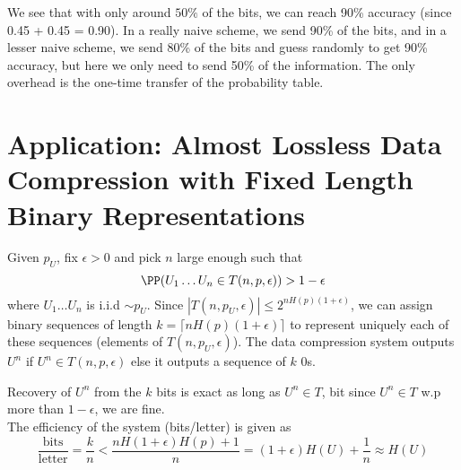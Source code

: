 \begin{figure}[h]
\centering
\end{figure}
We see that with only around $50\%$ of the bits, we can reach 90\% accuracy (since 0.45 + 0.45 = 0.90). In a really naive scheme, we send 90\% of the bits, and in a lesser naive scheme, we send 80\% of the bits and guess randomly to get 90\% accuracy, but here we only need to send 50\% of the information. The only overhead is the one-time transfer of the probability table.
\section{Application: Almost Lossless Data Compression with Fixed Length Binary Representations}
Given $p_U$, fix $\epsilon > 0$ and pick $n$ large enough such that 
\[\PP(U_1\dots U_n \in T(n, p, \epsilon)) > 1-\epsilon \]
where $U_1 \dots U_n$ is i.i.d $\sim p_U$. Since $|T(n, p_U, \epsilon)| \leq 2^{nH(p)(1+\epsilon)}$, we can assign binary sequences of length $k = \lceil nH(p)(1+\epsilon)\rceil$ to represent uniquely each of these sequences (elements of $T(n, p_U, \epsilon)$). The data compression system outputs $U^n$ if $U^n \in T(n,p,\epsilon)$ else it outputs a sequence of $k$ 0s.

Recovery of $U^n$ from the $k$ bits is exact as long as $U^n \in T$, bit since $U^n \in T$ w.p more than $1-\epsilon$, we are fine. \\
The efficiency of the system (bits/letter) is given as 
\[ \frac{\text{bits}}{\text{letter}} = \frac{k}{n} < \frac{nH(1+\epsilon)H(p) + 1}{n} = (1+\epsilon)H(U) + \frac{1}{n} \approx H(U)\]